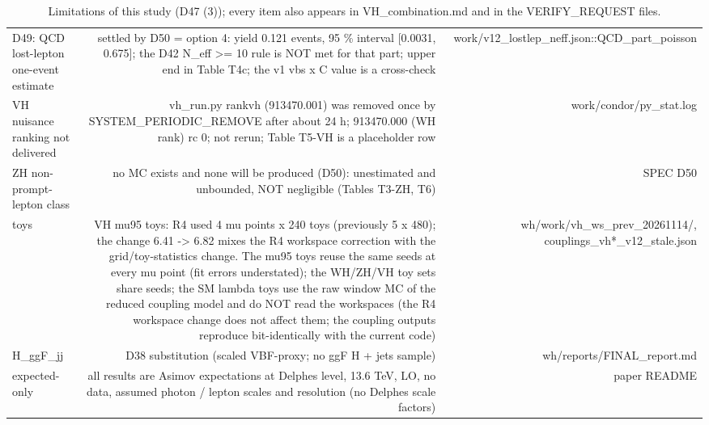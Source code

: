 \begin{table}[ht]
\begin{tabular}{lrr}
D49: QCD lost-lepton one-event estimate & settled by D50 = option 4: yield 0.121 events, 95 \% interval [0.0031, 0.675]; the D42 N\_eff >= 10 rule is NOT met for that part; upper end in Table T4c; the v1 vbs x C value is a cross-check & work/v12\_lostlep\_neff.json::QCD\_part\_poisson \\
VH nuisance ranking not delivered & vh\_run.py rankvh (913470.001) was removed once by SYSTEM\_PERIODIC\_REMOVE after about 24 h; 913470.000 (WH rank) rc 0; not rerun; Table T5-VH is a placeholder row & work/condor/py\_stat.log \\
ZH non-prompt-lepton class & no MC exists and none will be produced (D50): unestimated and unbounded, NOT negligible (Tables T3-ZH, T6) & SPEC D50 \\
toys & VH mu95 toys: R4 used 4 mu points x 240 toys (previously 5 x 480); the change 6.41 -> 6.82 mixes the R4 workspace correction with the grid/toy-statistics change. The mu95 toys reuse the same seeds at every mu point (fit errors understated); the WH/ZH/VH toy sets share seeds; the SM lambda toys use the raw window MC of the reduced coupling model and do NOT read the workspaces (the R4 workspace change does not affect them; the coupling outputs reproduce bit-identically with the current code) & wh/work/vh\_ws\_prev\_20261114/, couplings\_vh*\_v12\_stale.json \\
H\_ggF\_jj & D38 substitution (scaled VBF-proxy; no ggF H + jets sample) & wh/reports/FINAL\_report.md \\
expected-only & all results are Asimov expectations at Delphes level, 13.6 TeV, LO, no data, assumed photon / lepton scales and resolution (no Delphes scale factors) & paper README \\\hline
\end{tabular}
\caption{Limitations of this study (D47 (3)); every item also appears in VH\_combination.md and in the VERIFY\_REQUEST files.}
\end{table}
